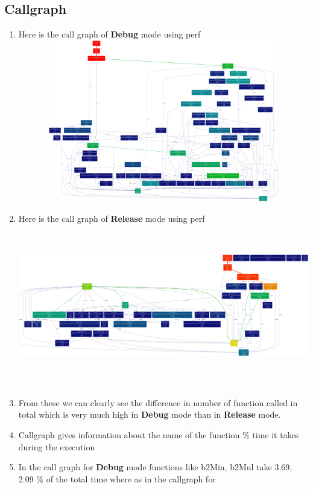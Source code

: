 \documentclass{article}
\begin{document}
\subsection{Callgraph}
\begin{enumerate}
\item Here is the call graph of \textbf{Debug} mode using perf\\
\includegraphics[width=560pt,height=200pt]{debug}\\
\item Here is the call graph of \textbf{Release} mode using perf\\
\includegraphics[width=560pt,height=200pt]{release}\\
\item From these we can clearly see the difference in number of function called in total which is very much high in 
\textbf{Debug} mode than in \textbf{Release} mode.
\item Callgraph gives information about the name of the function \% time it takes during the execution 
\item In the call graph for \textbf{Debug} mode functions like b2Min, b2Mul take 3.69, 2.09 \% of the total time where as in the callgraph for 

\end{enumerate}
\end{document}
